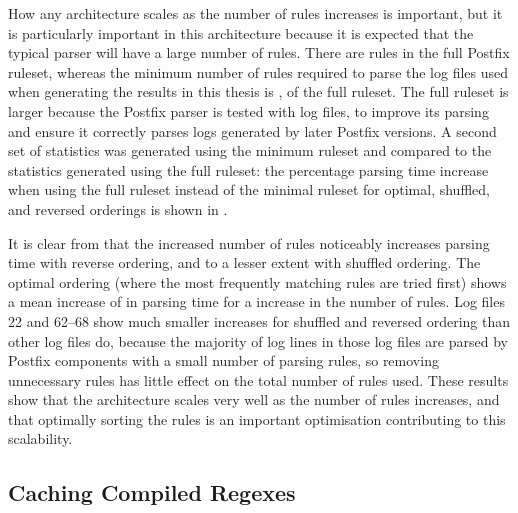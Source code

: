\label{scalability as the number of rules rises}

How any architecture scales as the number of rules increases is important,
but it is particularly important in this architecture because it is
expected that the typical parser will have a large number of rules.  There
are \numberOFrules{} rules in the full Postfix ruleset, whereas the minimum
number of rules required to parse the \numberOFlogFILES{} log files used
when generating the results in this thesis is \numberOFrulesMINIMUM{},
\numberOFrulesMINIMUMpercentage{} of the full ruleset.  The full ruleset is
larger because the Postfix parser is tested with \numberOFlogFILESall{} log
files, to improve its parsing and ensure it correctly parses logs generated
by later Postfix versions.  A second set of statistics was generated using
the minimum ruleset and compared to the statistics generated using the full
ruleset: the percentage parsing time increase when using the full ruleset
instead of the minimal ruleset for optimal, shuffled, and reversed
orderings is shown in .


It is clear from  that the increased number of rules noticeably
increases parsing time with reverse ordering, and to a lesser extent with
shuffled ordering.  The optimal ordering (where the most frequently
matching rules are tried first) shows a mean increase of
 in parsing time for a
\numberOFrulesMAXIMUMpercentage{} increase in the number of rules.  Log
files 22 and 62--68 show much smaller increases for shuffled and reversed
ordering than other log files do, because the majority of log lines in
those log files are parsed by Postfix components with a small number of
parsing rules, so removing unnecessary rules has little effect on the total
number of rules used.  These results show that the architecture scales very
well as the number of rules increases, and that optimally sorting the rules
is an important optimisation contributing to this scalability.

\subsection{Caching Compiled Regexes}

